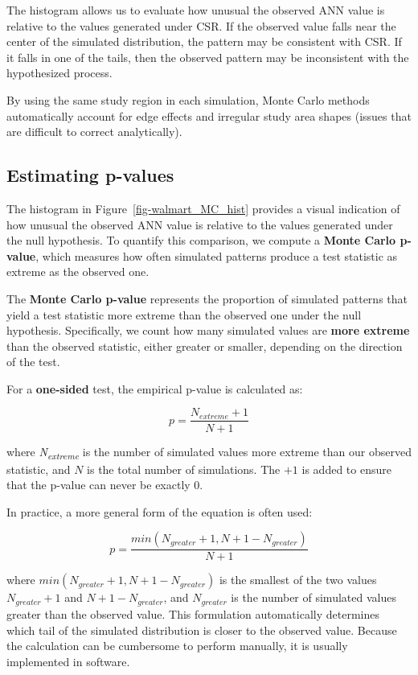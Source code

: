 \documentclass[
  letterpaper,
]{book}
\begin{document}
The histogram allows us to evaluate how unusual the observed ANN value
is relative to the values generated under CSR. If the observed value
falls near the center of the simulated distribution, the pattern may be
consistent with CSR. If it falls in one of the tails, then the observed
pattern may be inconsistent with the hypothesized process.

By using the same study region in each simulation, Monte Carlo methods
automatically account for edge effects and irregular study area shapes
(issues that are difficult to correct analytically).

\subsection{Estimating p-values}\label{estimating-p-values}

The histogram in Figure~\ref{fig-walmart_MC_hist} provides a visual
indication of how unusual the observed ANN value is relative to the
values generated under the null hypothesis. To quantify this comparison,
we compute a \textbf{Monte Carlo p-value}, which measures how often
simulated patterns produce a test statistic as extreme as the observed
one.

The \textbf{Monte Carlo p-value} represents the proportion of simulated
patterns that yield a test statistic more extreme than the observed one
under the null hypothesis. Specifically, we count how many simulated
values are \textbf{more extreme} than the observed statistic, either
greater or smaller, depending on the direction of the test.

For a \textbf{one-sided} test, the empirical p-value is calculated as:

\[
p = \dfrac{N_{extreme}+1}{N+1}
\]

where \emph{N\textsubscript{extreme}} is the number of simulated values
more extreme than our observed statistic, and \(N\) is the total number
of simulations. The \(+1\) is added to ensure that the p-value can never
be exactly 0.

In practice, a more general form of the equation is often used:

\[
p = \dfrac{min(N_{greater}+1 , N + 1 - N_{greater})}{N+1}
\]

where \(min(N_{greater}+1 , N + 1 - N_{greater})\) is the smallest of
the two values \(N_{greater}+1\) and \(N + 1 - N_{greater}\), and
\(N_{greater}\) is the number of simulated values greater than the
observed value. This formulation automatically determines which tail of
the simulated distribution is closer to the observed value. Because the
calculation can be cumbersome to perform manually, it is usually
implemented in software.
\end{document}
